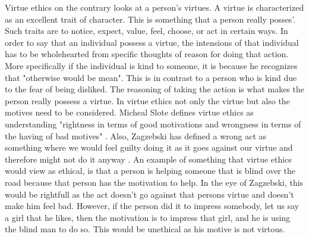 Virtue ethics on the contrary looks at a person's virtues. A virtue is characterized as an excellent trait of character. This is something that a person really posses'. Such traits are to notice, expect, value, feel, choose, or act in certain ways. In order to say that an individual possess a virtue, the intensions of that individual has to be wholehearted from specific thoughts of reason for doing that action. More specifically if the individual is kind to someone, it is because he recognizes that "otherwise would be mean". This is in contrast to a person who is kind due to the fear of being disliked. The reasoning of taking the action is what makes the person really possess a virtue. 
In virtue ethics not only the virtue but also the motives need to be considered. Micheal Slote defines virtue ethics as understanding "rightness in terms of good motivations and wrongness in terms of the having of bad motives" \cite{slote:2001}. Also, Zagzebski has defined a wrong act as something where we would feel guilty doing it as it goes against our virtue and therefore might not do it anyway \cite{zagzebski:2004}. 
An example of something that virtue ethics would view as ethical, is that a person is helping someone that is blind over the road because that person has the motivation to help. In the eye of Zagzebski, this would be rightfull as the act doesn't go against that persons virtue and doesn't make him feel bad. However, if the person did it to impress somebody, let us say a girl that he likes, then the motivation is to impress that girl, and he is using the blind man to do so. This would be unethical as his motive is not virtous. 

